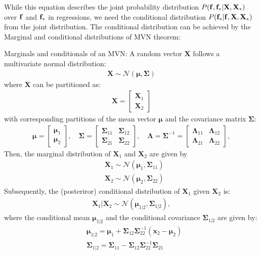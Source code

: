 While this equation describes the joint probability distribution $P({\mathbf{f}}, {\mathbf{f}}_*|\mathbf{X}, \mathbf{X}_*)$ over ${\mathbf{f}}$ and ${\mathbf{f}}_*$ in regressions, we need the conditional distribution $P({\mathbf{f}}_*|{\mathbf{f}}, \mathbf{X}, \mathbf{X}_*)$ from the joint distribution. The conditional distribution can be achieved by the Marginal and conditional distributions of MVN theorem:

\begin{theorem} Marginals and conditionals of an MVN:
A random vector $\mathbf{X}$ follows a multivariate normal distribution:
\begin{align*}
	\mathbf{X} \sim \mathcal{N}(\boldsymbol{\mu}, \mathbf{\Sigma})
\end{align*}
where $\mathbf{X}$ can be partitioned as:
\begin{align*}
	\mathbf{X} = \begin{bmatrix}
	\mathbf{X}_1 \\
	\mathbf{X}_2
	\end{bmatrix}
\end{align*}
with corresponding partitions of the mean vector $\boldsymbol{\mu}$ and the covariance matrix \(\mathbf{\Sigma}\):
\begin{align*}
\boldsymbol{\mu} = \begin{bmatrix}
\boldsymbol{\mu}_1 \\
\boldsymbol{\mu}_2
\end{bmatrix}, \quad
\mathbf{\Sigma} = \begin{bmatrix}
\mathbf{\Sigma}_{11} & \mathbf{\Sigma}_{12} \\
\mathbf{\Sigma}_{21} & \mathbf{\Sigma}_{22}
\end{bmatrix},\quad
\mathbf{\Lambda} = \mathbf{\Sigma}^{-1} = \begin{bmatrix}
\mathbf{\Lambda}_{11} & \mathbf{\Lambda}_{12} \\
\mathbf{\Lambda}_{21} & \mathbf{\Lambda}_{22}
\end{bmatrix},
\end{align*}
Then, the marginal distribution of $\mathbf{X}_1$ and $\mathbf{X}_2$ are given by
\begin{align*}
	&\mathbf{X}_1 \sim \mathcal{N}(\boldsymbol{\mu}_1, \mathbf{\Sigma}_{11})\\
	&\mathbf{X}_2 \sim \mathcal{N}(\boldsymbol{\mu}_2, \mathbf{\Sigma}_{22})
\end{align*}
Subsequently, the (posteriror) conditional distribution of $\mathbf{X}_1$ given $\mathbf{X}_2$ is:
\begin{align*}
	\mathbf{X}_1 | \mathbf{X}_2 \sim \mathcal{N}(\boldsymbol{\mu}_{1|2}, \mathbf{\Sigma}_{1|2}),
\end{align*}
where the conditional mean \(\boldsymbol{\mu}_{1|2}\) and the conditional covariance \(\mathbf{\Sigma}_{1|2}\) are given by:
\begin{align*}
	&\boldsymbol{\mu}_{1|2} = \boldsymbol{\mu}_1 + \mathbf{\Sigma}_{12}\mathbf{\Sigma}_{22}^{-1} (\mathbf{x}_2 - \boldsymbol{\mu}_2)\\
	&\mathbf{\Sigma}_{1|2} = \mathbf{\Sigma}_{11} - \mathbf{\Sigma}_{12}\mathbf{\Sigma}_{22}^{-1}\mathbf{\Sigma}_{21}
\end{align*}
\end{theorem}
